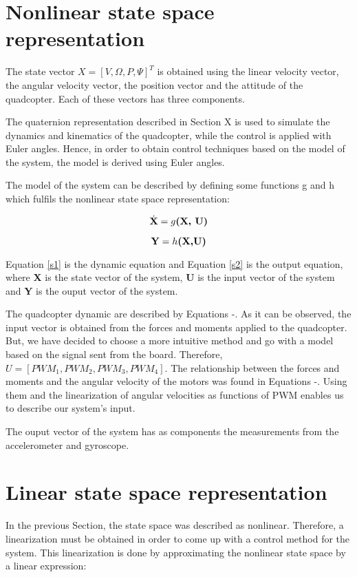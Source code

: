 \section{Nonlinear state space representation}
The state vector $X=[V, \Omega, P, \Psi]^{T}$ is obtained using the linear velocity vector, the angular velocity vector, the position vector and the attitude of the quadcopter. Each of these vectors has three components.

The quaternion representation described in Section X is used to simulate the dynamics and kinematics of the quadcopter, while the control is applied with Euler angles. Hence, in order to obtain control techniques based on the model of the system, the model is derived using Euler angles.

The model of the system can be described by defining some functions g and h which fulfils the nonlinear state space representation:

\begin{equation}
\label{s1} 
 	\dot{\textbf{X}}=g\textbf{(X, U)} \\
 \end{equation}

\begin{equation}
\label{s2} 
 	\textbf{Y}=h\textbf{(X,U)} \\
 \end{equation}
 
Equation \ref{s1} is the dynamic equation and Equation \ref{s2}  is the output equation, where \textbf{X} is the state vector of the system, \textbf{U} is the input vector of the system and \textbf{Y} is the ouput vector of the system.

The quadcopter dynamic are described by Equations \label{S6}-\label{S10}. As it can be observed, the input vector is obtained from the forces and moments applied to the quadcopter. But, we have decided to choose a more intuitive method and go with a model based on the signal sent from the board. Therefore, $U=[PWM_{1}, PWM_{2}, PWM_{3}, PWM_{4}]$. The relationship between the forces and moments and the angular velocity of the motors was found in Equations \label{motor1}-\label{motor4}. Using them and the linearization of angular velocities as functions of PWM enables us to describe our system's input.

The ouput vector of the system has as components the measurements from the accelerometer and gyroscope.

\section{Linear state space representation}
In the previous Section, the state space was described as nonlinear. Therefore, a linearization must be obtained in order to come up with a control method for the system. This linearization is done by approximating the nonlinear state space by a linear expression:

